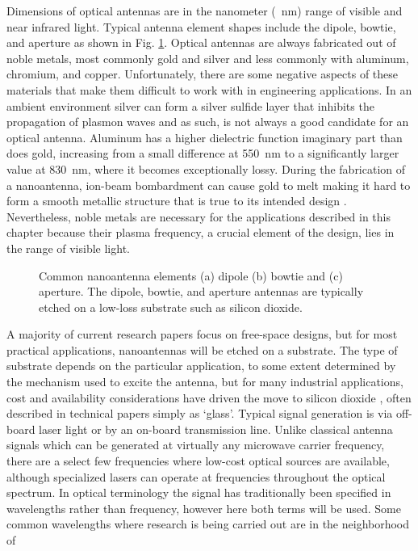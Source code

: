 Dimensions of optical antennas are in the nanometer (\SI{}{\nm}) range of visible and near infrared light. Typical antenna element shapes include the dipole, bowtie, and aperture as shown in Fig. \ref{fig:antennas}. Optical antennas are always fabricated out of noble metals, most commonly gold and silver and less commonly with aluminum, chromium, and copper. Unfortunately, there are some negative aspects of these materials that make them difficult to work with in engineering applications. In an ambient environment silver can form a silver sulfide layer that inhibits the propagation of plasmon waves \cite{Nevels2014} and as such, is not always a good candidate for an optical antenna. Aluminum has a higher dielectric function imaginary part than does gold, increasing from a small
difference at \SI{550}{\nm} to a significantly larger value at \SI{830}{\nm}, where it becomes exceptionally lossy. During the fabrication of a nanoantenna, ion-beam bombardment can cause gold to melt making it hard to form a smooth metallic structure that is true to its intended design \cite{farahani}. Nevertheless, noble metals are necessary for the applications described in this chapter because their plasma frequency, a crucial element of the design, lies in the range of visible light.
%
\begin{figure}[h!]
   \hfil
   \hfil
  \caption{Common nanoantenna elements (a) dipole (b) bowtie and (c) aperture. The dipole, bowtie, and aperture antennas are typically etched on a low-loss substrate such as silicon dioxide.}
  \label{fig:antennas}
\end{figure}
%
A majority of current research papers focus on free-space designs, but for most practical applications, nanoantennas will be etched on a substrate. The type of substrate depends on the particular application, to some extent determined by the mechanism used to excite the antenna, but for many industrial applications, cost and availability considerations have driven the move to silicon dioxide , often described in technical papers simply as `glass'. Typical signal generation is via off-board laser light or by an on-board transmission line. Unlike classical antenna signals which can be generated at virtually any microwave carrier frequency, there are a select few frequencies where low-cost optical sources are available, although specialized lasers can operate at frequencies throughout the optical spectrum. In optical terminology the signal has traditionally been specified in wavelengths rather than frequency, however here both terms will be used. Some common wavelengths where research is being carried out are in the neighborhood of
